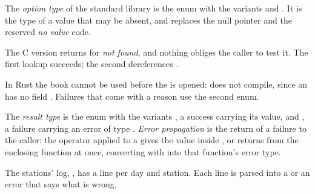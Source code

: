 \begin{definition}\label{def:b2:rust-enums-and-errors:option}
The \emph{option type}  of the standard library is the enum with the variants
 and . It is the type of a value that may be absent, and replaces the null pointer and the
reserved \emph{no value} code.
\end{definition}

\label{lst:b2:rust-enums-and-errors:option}

\label{out:b2:rust-enums-and-errors:option}

The C version returns  for \emph{not found}, and nothing obliges the caller to test it. The first lookup
succeeds; the second dereferences .

\label{out:b2:rust-enums-and-errors:null}

In Rust the book cannot be used before the  is opened:  does not compile, since an
 has no field . Failures that come with a reason use the second enum.

\begin{definition}\label{def:b2:rust-enums-and-errors:result}
The \emph{result type}  is the enum with the variants , a success
carrying its value, and , a failure carrying an error of type . \emph{Error
propagation} is the return of a failure to the caller: the operator  applied to a
 gives the value inside , or returns  from the enclosing function at once,
converting  with  into that function's error type.
\end{definition}

The stations' log, , has a line per day and station. Each line is parsed into a
 or an error that says what is wrong.

\label{lst:b2:rust-enums-and-errors:parse}

